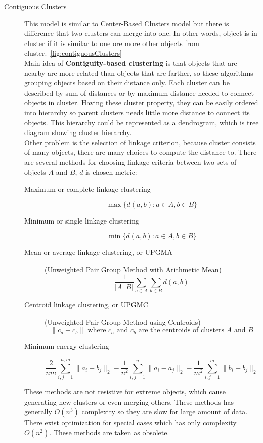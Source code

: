 \begin{description}
\item[Contiguous Clusters] This model is similar to Center-Based Clusters model but there is difference that two clusters can merge into one. In other words, object is in cluster if it is similar to one ore more other objects from cluster.~\autoref{fig:contiguousClusters}\\
Main idea of \textbf{Contiguity-based clustering} is that objects that are nearby are more related than objects that are farther, so these algorithms grouping objects based on their distance only. Each cluster can be described by sum of distances or by maximum distance needed to connect objects in cluster. Having these cluster property, they can be easily ordered into hierarchy so parent clusters needs little more distance to connect its objects. This hierarchy could be represented as a dendrogram, which is tree diagram showing cluster hierarchy.\\

Other problem is the selection of linkage criterion, because cluster consists of many objects, there are many choices to compute the distance to. There are several methods for choosing linkage criteria between two sets of objects $A$ and $B$, $d$ is chosen metric:
\begin{description}
\item[Maximum or complete linkage clustering] $$\max\{d(a,b) : a \in A, b \in B\}$$
\item[Minimum or single linkage clustering] $$\min\{d(a,b) : a \in A, b \in B\}$$
\item[Mean or average linkage clustering, or UPGMA] (Unweighted Pair Group Method with Arithmetic Mean) $$\frac{1}{|A||B|}\sum_{a \in A} \sum_{b \in B} d(a,b)$$
\item[Centroid linkage clustering, or UPGMC] (Unweighted Pair-Group Method using Centroids) $$\|c_a - c_b\| \mbox{ where } c_a \mbox{ and } c_b \mbox{ are the centroids of clusters } A \mbox{ and } B$$
\item[Minimum energy clustering] $$\frac{2}{nm}\sum_{i,j=1}^{n,m}\|a_i-b_j\|_2-\frac{1}{n^2}\sum_{i,j=1}^{n}\|a_i-a_j\|_2-\frac{1}{m^2}\sum_{i,j=1}^{m}\|b_{i}-b_{j}\|_{2}$$
\end{description}

These methods are not resistive for extreme objects, which cause generating new clusters or even merging others. These methods has generally $O(n^3)$ complexity so they are slow for large amount of data. There exist optimization for special cases which has only complexity $O(n^2)$. These methods are taken as obsolete.


\end{description}
